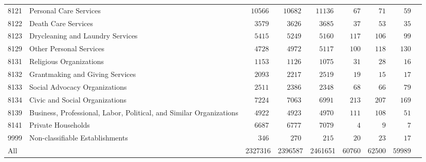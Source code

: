 \documentclass[9pt, oneside]{article}   	%
\begin{document}
\begin{longtable}{lp{3 in}ccccccc}
8121  & Personal Care Services & $\phantom{0}10566$ & $\phantom{0}10682$ & $\phantom{0}11136$ & $\phantom{000}67$ & $\phantom{000}71$ & $\phantom{000}59$ \\
8122  & Death Care Services & $\phantom{00}3579$ & $\phantom{00}3626$ & $\phantom{00}3685$ & $\phantom{000}37$ & $\phantom{000}53$ & $\phantom{000}35$ \\
8123  & Drycleaning and Laundry Services & $\phantom{00}5415$ & $\phantom{00}5249$ & $\phantom{00}5160$ & $\phantom{00}117$ & $\phantom{00}106$ & $\phantom{000}99$ \\
8129  & Other Personal Services & $\phantom{00}4728$ & $\phantom{00}4972$ & $\phantom{00}5117$ & $\phantom{00}100$ & $\phantom{00}118$ & $\phantom{00}130$ \\
8131  & Religious Organizations & $\phantom{00}1153$ & $\phantom{00}1126$ & $\phantom{00}1075$ & $\phantom{000}31$ & $\phantom{000}28$ & $\phantom{000}16$ \\
8132  & Grantmaking and Giving Services & $\phantom{00}2093$ & $\phantom{00}2217$ & $\phantom{00}2519$ & $\phantom{000}19$ & $\phantom{000}15$ & $\phantom{000}17$ \\
8133  & Social Advocacy Organizations & $\phantom{00}2511$ & $\phantom{00}2386$ & $\phantom{00}2348$ & $\phantom{000}68$ & $\phantom{000}66$ & $\phantom{000}79$ \\
8134  & Civic and Social Organizations & $\phantom{00}7224$ & $\phantom{00}7063$ & $\phantom{00}6991$ & $\phantom{00}213$ & $\phantom{00}207$ & $\phantom{00}169$ \\
8139  & Business, Professional, Labor, Political, and Similar Organizations & $\phantom{00}4922$ & $\phantom{00}4923$ & $\phantom{00}4970$ & $\phantom{00}111$ & $\phantom{00}108$ & $\phantom{000}51$ \\
8141  & Private Households & $\phantom{00}6687$ & $\phantom{00}6777$ & $\phantom{00}7079$ & $\phantom{0000}4$ & $\phantom{0000}9$ & $\phantom{0000}7$ \\
9999  & Non-classifiable Establishments & $\phantom{000}346$ & $\phantom{000}270$ & $\phantom{000}215$ & $\phantom{000}20$ & $\phantom{000}23$ & $\phantom{000}17$ \\
\cline{1-1} \cline{2-2} \cline{3-3} \cline{4-4} \cline{5-5} \cline{6-6} \cline{7-7} \cline{8-8} \cline{9-9} %
All  &  &2327316  &2396587 &  2461651 & $60760$ & $62500$ & $59989$ \\
\hline 
\end{longtable}
\end{document}
